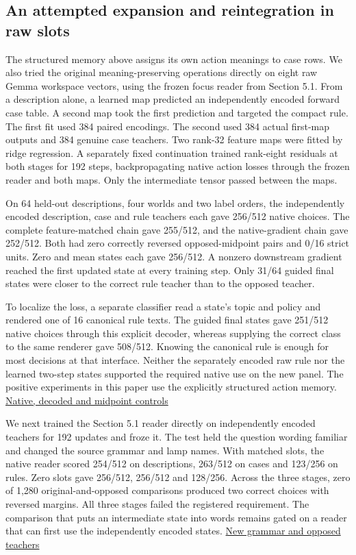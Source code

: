 \documentclass[11pt]{article}
\begin{document}
\subsection{An attempted expansion and reintegration in raw slots}

The structured memory above assigns its own action meanings to case rows. We also tried the original meaning-preserving operations directly on eight raw Gemma workspace vectors, using the frozen focus reader from Section 5.1. From a description alone, a learned map predicted an independently encoded forward case table. A second map took the first prediction and targeted the compact rule. The first fit used 384 paired encodings. The second used 384 actual first-map outputs and 384 genuine case teachers. Two rank-32 feature maps were fitted by ridge regression. A separately fixed continuation trained rank-eight residuals at both stages for 192 steps, backpropagating native action losses through the frozen reader and both maps. Only the intermediate tensor passed between the maps.

On 64 held-out descriptions, four worlds and two label orders, the independently encoded description, case and rule teachers each gave 256/512 native choices. The complete feature-matched chain gave 255/512, and the native-gradient chain gave 252/512. Both had zero correctly reversed opposed-midpoint pairs and 0/16 strict units. Zero and mean states each gave 256/512. A nonzero downstream gradient reached the first updated state at every training step. Only 31/64 guided final states were closer to the correct rule teacher than to the opposed teacher.

To localize the loss, a separate classifier read a state's topic and policy and rendered one of 16 canonical rule texts. The guided final states gave 251/512 native choices through this explicit decoder, whereas supplying the correct class to the same renderer gave 508/512. Knowing the canonical rule is enough for most decisions at that interface. Neither the separately encoded raw rule nor the learned two-step states supported the required native use on the new panel. The positive experiments in this paper use the explicitly structured action memory. \href{https://github.com/RyoSpiralArchitect/self-fold/blob/v1.0.0/provenance/stage_grammar_20261104/RESULTS.md#expansion-and-reintegration-on-a-frozen-native-reader}{Native, decoded and midpoint controls}

We next trained the Section 5.1 reader directly on independently encoded teachers for 192 updates and froze it. The test held the question wording familiar and changed the source grammar and lamp names. With matched slots, the native reader scored 254/512 on descriptions, 263/512 on cases and 123/256 on rules. Zero slots gave 256/512, 256/512 and 128/256. Across the three stages, zero of 1,280 original-and-opposed comparisons produced two correct choices with reversed margins. All three stages failed the registered requirement. The comparison that puts an intermediate state into words remains gated on a reader that can first use the independently encoded states. \href{https://github.com/RyoSpiralArchitect/self-fold/blob/v1.0.0/provenance/preprint_v1_20261104/RESULTS.md#independently-encoded-teachers}{New grammar and opposed teachers}
\end{document}
